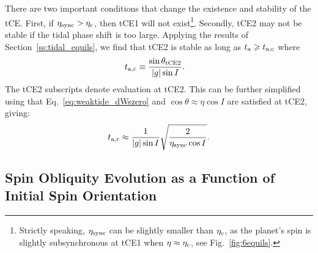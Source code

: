 \documentclass[
        fleqn,
        usenatbib,
    ]{mnras}
\newcommand*{\abs}[1]{\left|#1\right|}
\begin{document}
There are two important conditions that change the existence and stability of
the tCE\@. First, if $\eta_{\rm sync} > \eta_{\rm c}$, then tCE1 will not
exist\footnote{Strictly speaking, $\eta_{\rm sync}$ can be slightly smaller than
$\eta_{\rm c}$, as the planet's spin is slightly subsynchronous at tCE1 when
$\eta \approx \eta_{\rm c}$, see Fig.~\ref{fig:6equils}.}. Secondly, tCE2 may
not be stable if the tidal phase shift is too large. Applying the results of
Section~\ref{ss:tidal_equils}, we find that tCE2 is stable as long as $t_{\rm a}
\geq t_{\rm a, c}$ where
\begin{align}
    t_{\rm a, c} &\equiv \frac{\sin \theta_{\rm tCE2}}{\abs{g} \sin I}.
        \label{eq:def_ta_crit}
\end{align}
The tCE2 subscripts denote evaluation at tCE2. This can be further simplified
using that Eq.~\eqref{eq:weaktide_dWszero} and $\cos \theta \approx
\eta \cos I$ are satisfied at tCE2, giving:
\begin{equation}
    t_{\rm a,c} \approx \frac{1}{\abs{g}\sin I}\sqrt{\frac{2}{\eta_{\rm sync}
        \cos I}}.
\end{equation}

\subsection{Spin Obliquity Evolution as a Function of Initial Spin Orientation}
\end{document}
